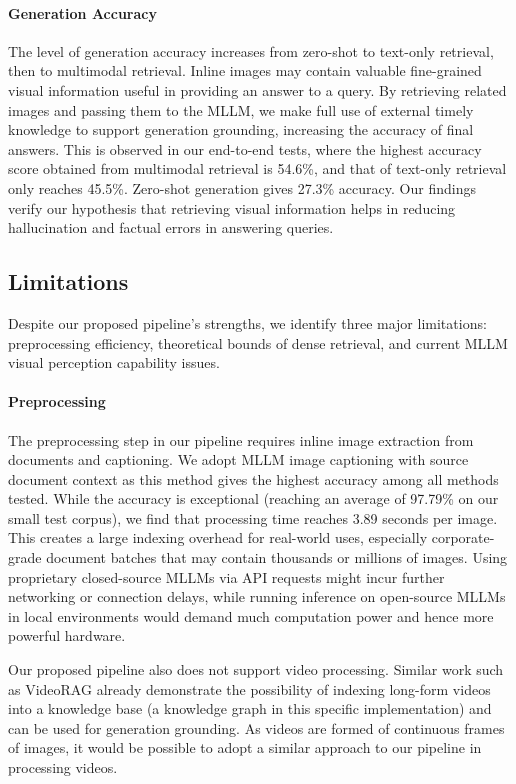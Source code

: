 \paragraph{Generation Accuracy}
The level of generation accuracy increases from zero-shot to text-only retrieval, then to multimodal retrieval.
Inline images may contain valuable fine-grained visual information useful in providing an answer to a query.
By retrieving related images and passing them to the MLLM, we make full use of external timely knowledge to support generation grounding,
increasing the accuracy of final answers.
This is observed in our end-to-end tests, where the highest accuracy score obtained from multimodal retrieval is 54.6\%,
and that of text-only retrieval only reaches 45.5\%.
Zero-shot generation gives 27.3\% accuracy.
Our findings verify our hypothesis that retrieving visual information helps in reducing hallucination and factual errors in answering queries.


\subsection{Limitations}

Despite our proposed pipeline's strengths, we identify three major limitations: 
preprocessing efficiency, theoretical bounds of dense retrieval, and current MLLM visual perception capability issues.

\paragraph{Preprocessing}
The preprocessing step in our pipeline requires inline image extraction from documents and captioning.
We adopt MLLM image captioning with source document context as this method gives the highest accuracy among all methods tested.
While the accuracy is exceptional (reaching an average of 97.79\% on our small test corpus),
we find that processing time reaches 3.89 seconds per image.
This creates a large indexing overhead for real-world uses, especially corporate-grade document batches that may contain thousands or millions of images.
Using proprietary closed-source MLLMs via API requests might incur further networking or connection delays,
while running inference on open-source MLLMs in local environments would demand much computation power and hence more powerful hardware.

Our proposed pipeline also does not support video processing.
Similar work such as VideoRAG \cite{ren2025videoragretrievalaugmentedgenerationextreme} already demonstrate the possibility of 
indexing long-form videos into a knowledge base (a knowledge graph in this specific implementation) and can be used for generation grounding.
As videos are formed of continuous frames of images, it would be possible to adopt a similar approach to our pipeline in processing videos.


